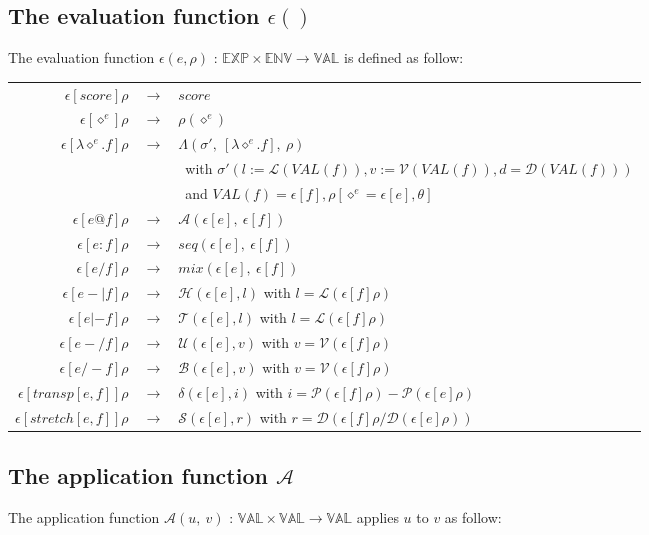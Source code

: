 \documentclass[10pt,a4paper,frenchb]{article}
\makeatletter
\newcommand{\evaltable}[1][$\rightarrow$]	  {\begin{center} \begin{tabular*}{\linewidth}{rc@{ #1 }l}}
\newcommand{\evaltablend}  		{\end{tabular*}\end{center}}
\newcommand{\var}[1]		{\ensuremath{\diamond^#1}}
\newcommand{\expr}		{\ensuremath{\mathbb{EXP}}}
\newcommand{\val}		{\ensuremath{\mathbb{VAL}}}
\newcommand{\env}		{\ensuremath{\mathbb{ENV}}}
\newcommand{\clossym}	{\ensuremath{\Lambda}}
\newcommand{\applyop}	{\ensuremath{@}}
\newcommand{\sdomain}[3]{$#1 \times #2 \rightarrow #3$}
\newcommand{\evalsym}			{\ensuremath{\epsilon}}
\newcommand{\envsym}				{\ensuremath{\rho}}
\newcommand{\emptyenv}			{\ensuremath{\theta}}
\newcommand{\applysym}			{\ensuremath{\mathcal A}}
\newcommand{\closure}[4]			{\ensuremath{\clossym\left(#4,\ \left[\lambdaexpr{#1}{#2}\right],\ #3 \right)}}
\newcommand{\evalss}[1]				{\ensuremath{\evalsym\left[#1\right]}}
\newcommand{\evalsimple}[2][\envsym]	{\ensuremath{\evalsym\left[#2\right]#1}}
\newcommand{\applysimple}[2]			{\ensuremath{\applysym\left(#1,\ #2\right)}}
\newcommand{\opexpr}[1] 		{e #1 f}
\newcommand{\lambdaexpr}[2]	{\lambda \var{#1}.#2}
\newcommand{\ra}	{\ensuremath{\rightarrow}}
\newcommand{\seq}			{:}
\newcommand{\mix}			{/}
\newcommand{\length}			{\ensuremath{\mathcal L}}
\newcommand{\voices}			{\ensuremath{\mathcal V}}
\newcommand{\pitch}			{\ensuremath{\mathcal P}}
\newcommand{\dur}			{\ensuremath{\mathcal D}}
\newcommand{\head}			{\ensuremath{\mathcal H}}
\newcommand{\tail}			{\ensuremath{\mathcal T}}
\renewcommand{\top}			{\ensuremath{\mathcal U}}
\newcommand{\bottom}			{\ensuremath{\mathcal B}}
\newcommand{\transp}			{\ensuremath{\delta}}
\renewcommand{\stretch}		{\ensuremath{\mathcal S}}
\newcommand{\bounds}			{\ensuremath{\sigma}}
\newcommand{\sevalScore}[1]				{\ensuremath{#1}}
\newcommand{\sevalVar}[2][\envsym]		{\ensuremath{#1\left(\var{#2}\right)}}
\newcommand{\sevalLambda}[4]				{\ensuremath{\closure{#1}{#2}{#3}{#4}}}
\newcommand{\sevalApply}[2]				{\ensuremath{\applysimple{\evalss{#1}}{\evalss{#2}}}}
\newcommand{\sevalSeq}[2]				{\ensuremath{seq\left(\evalss{#1}, \ \evalss{#2}\right)}}
\newcommand{\sevalMix}[2]				{\ensuremath{mix\left(\evalss{#1}, \ \evalss{#2}\right)}}
\newcommand{\sevalHead}[2]				{\ensuremath{\head \left(\evalss{#1},#2\right)}}
\newcommand{\sevalTail}[2]				{\ensuremath{\tail \left(\evalss{#1},#2\right)}}
\newcommand{\sevalTop}[2]				{\ensuremath{\top \left(\evalss{#1},#2\right)}}
\newcommand{\sevalBottom}[2]				{\ensuremath{\bottom \left(\evalss{#1},#2\right)}}
\newcommand{\sevalTransp}[2]				{\ensuremath{\transp \left(\evalss{#1},#2\right)}}
\newcommand{\sevalStretch}[2]			{\ensuremath{\stretch \left(\evalss{#1},#2\right)}}
\makeatother
\begin{document}
\subsection{The evaluation function $\evalsym()$}
\label{evalsimple}

The evaluation function $\evalsym(e,\envsym)$ : \sdomain{\expr}{\env}{\val} is defined as follow:

\evaltable[]
 \hline
 $\evalsimple{score}$				& \ra & \sevalScore{score} \\
 $\evalsimple{\var{e}}$ 				& \ra & \sevalVar{e} \\
 $\evalsimple{\lambdaexpr{e}{f}}$ 	& \ra & \sevalLambda{e}{f}{\envsym}{\bounds'} \\
 			& & \ with $\bounds'(l:=\length(VAL(f)), v:=\voices(VAL(f)), d=\dur(VAL(f)))$ \\
			& & \ and $VAL(f) = \evalss{f},\envsym[\var{e}= \evalss{e}, \emptyenv]$\\
 $\evalsimple{\opexpr{\applyop}}$ 	& \ra & \sevalApply{e}{f} \\
 $\evalsimple{\opexpr{\seq}}$		& \ra & \sevalSeq{e}{f} \\
 $\evalsimple{\opexpr{\mix}}$ 		& \ra & \sevalMix{e}{f} \\
 $\evalsimple{\opexpr{-|}}$ 			& \ra & \sevalHead{e}{l} with $l = \length(\evalsimple{f})$ \\

 $\evalsimple{\opexpr{|-}}$ 		& \ra & \sevalTail{e}{l} 		with $l = \length(\evalsimple{f})$ \\
 $\evalsimple{\opexpr{-/}}$ 		& \ra & \sevalTop{e}{v} 		with $v = \voices(\evalsimple{f})$ \\
 $\evalsimple{\opexpr{/-}}$ 		& \ra & \sevalBottom{e}{v} 	with $v = \voices(\evalsimple{f})$ \\

 $\evalsimple{transp[e,f]}$ 		& \ra & \sevalTransp{e}{i} 	with $i = \pitch(\evalsimple{f}) - \pitch(\evalsimple{e}) $ \\
 $\evalsimple{stretch[e,f]}$ 	& \ra & \sevalStretch{e}{r} 	with $r = \dur(\evalsimple{f} / \dur(\evalsimple{e}))$ \\
 \hline
\evaltablend

\subsection{The application function $\applysym{}$}
The application function $\applysimple{u}{v}$ : \sdomain{\val}{\val}{\val} applies $u$ to $v$ as follow:
\end{document}
